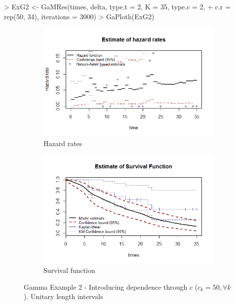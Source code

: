 \documentclass[letterpaper]{article}
\begin{document}
\begin{Schunk}
\begin{Sinput}
> ExG2 <- GaMRes(times, delta, type.t = 2, K = 35, type.c = 2, 
+                c.r = rep(50, 34), iterations = 3000)
> GaPloth(ExG2)
\end{Sinput}
\end{Schunk}
\begin{figure}
  \centering
  \begin{subfigure}[a]{\textwidth}\centering
    \includegraphics[width=\textwidth]{G21.png}
    \caption{Hazard rates}
  \end{subfigure}
  \begin{subfigure}[b]{\textwidth}\centering
    \includegraphics[width=\textwidth]{G22.png}
    \caption{Survival function}
  \end{subfigure}
  \caption{Gamma Example 2 - Introducing dependence through $c$ ($c_k=50, \forall k$). Unitary length intervals}
  \label{fig:G2}
\end{figure}
\end{document}
